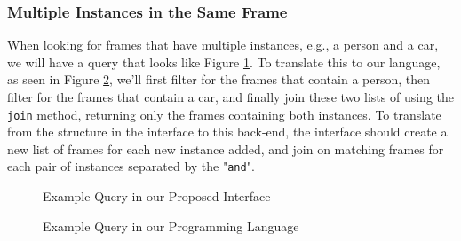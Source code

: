 \subsubsection{Multiple Instances in the Same Frame}
When looking for frames that have multiple instances, e.g., a person and a car, we will have a query that looks like Figure \ref{fig:Multiple1}. To translate this to our language, as seen in Figure \ref{fig:Multiple2}, we'll first filter for the frames that contain a person, then filter for the frames that contain a car, and finally join these two lists of  using the \texttt{join} method, returning only the frames containing both instances. 
To translate from the structure in the interface to this back-end, the interface should create a new list of frames for each new instance added, and join on matching frames for each pair of instances separated by the "\texttt{and}".

\begin{figure}[H]
    \caption{Example Query in our Proposed Interface}
    \label{fig:Multiple1}
\end{figure}

\begin{figure}[H]
    \caption{Example Query in our Programming Language}
    \label{fig:Multiple2}
\end{figure}

